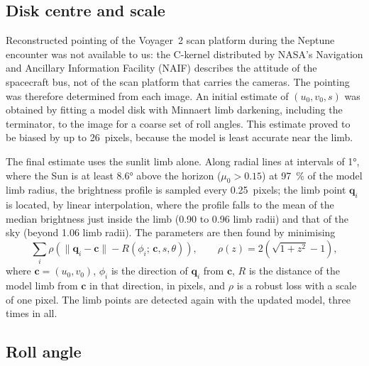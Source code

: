 \documentclass[11pt,a4paper]{article}
\newcommand{\vect}[1]{\mathbf{#1}}
\begin{document}
\subsection{Disk centre and scale}\label{sec:pointing}

Reconstructed pointing of the Voyager~2 scan platform during the Neptune encounter was not
available to us: the C-kernel distributed by NASA's Navigation and Ancillary Information Facility
(NAIF) describes the attitude of the spacecraft bus, not of the scan platform that carries the
cameras. The pointing was therefore determined from each image. An initial estimate of
$(u_{0}, v_{0}, s)$ was obtained by fitting a model disk with Minnaert limb darkening, including the
terminator, to the image for a coarse set of roll angles. This estimate proved to be biased by up
to 26~pixels, because the model is least accurate near the limb.

The final estimate uses the sunlit limb alone. Along radial lines at intervals of \ang{1}, where
the Sun is at least \ang{8.6} above the horizon ($\mu_{0} > 0.15$) at \SI{97}{\percent} of the
model limb radius, the brightness profile is sampled every 0.25~pixels; the limb point
$\vect{q}_{i}$ is located, by linear interpolation, where the profile falls to the mean of the
median brightness just inside the limb (0.90 to 0.96 limb radii) and that of the sky (beyond 1.06
limb radii). The parameters are then found by minimising
\begin{equation}
\sum_{i} \rho\!\left(\lVert\vect{q}_{i} - \vect{c}\rVert - R(\phi_{i};\, \vect{c}, s, \theta)\right),
\qquad \rho(z) = 2\left(\sqrt{1 + z^{2}} - 1\right),
\label{eq:limb}
\end{equation}
where $\vect{c} = (u_{0}, v_{0})$, $\phi_{i}$ is the direction of $\vect{q}_{i}$ from $\vect{c}$,
$R$ is the distance of the model limb from $\vect{c}$ in that direction, in pixels, and $\rho$ is a
robust loss with a scale of one pixel. The limb points are detected again with the updated model,
three times in all.

\subsection{Roll angle}\label{sec:roll}
\end{document}
